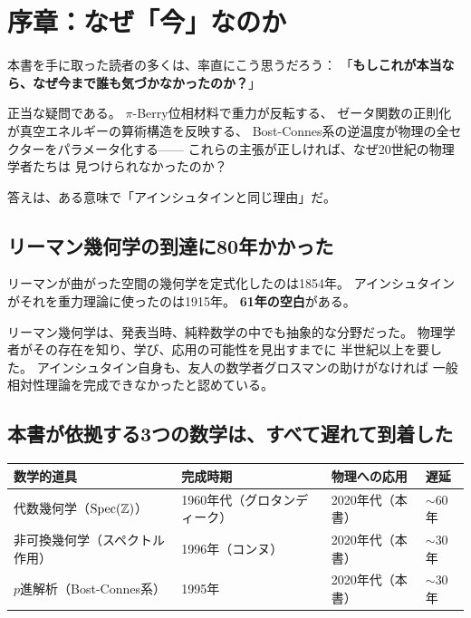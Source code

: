 
\section*{序章：なぜ「今」なのか}

\vspace{1em}

本書を手に取った読者の多くは、率直にこう思うだろう：
「\textbf{もしこれが本当なら、なぜ今まで誰も気づかなかったのか？}」

正当な疑問である。
$\pi$-Berry位相材料で重力が反転する、
ゼータ関数の正則化が真空エネルギーの算術構造を反映する、
Bost-Connes系の逆温度が物理の全セクターをパラメータ化する——
これらの主張が正しければ、なぜ20世紀の物理学者たちは
見つけられなかったのか？

答えは、ある意味で「アインシュタインと同じ理由」だ。

\subsection*{リーマン幾何学の到達に80年かかった}

リーマンが曲がった空間の幾何学を定式化したのは1854年。
アインシュタインがそれを重力理論に使ったのは1915年。
\textbf{61年の空白}がある。

リーマン幾何学は、発表当時、純粋数学の中でも抽象的な分野だった。
物理学者がその存在を知り、学び、応用の可能性を見出すまでに
半世紀以上を要した。
アインシュタイン自身も、友人の数学者グロスマンの助けがなければ
一般相対性理論を完成できなかったと認めている。

\subsection*{本書が依拠する3つの数学は、すべて遅れて到着した}

\begin{center}
\begin{tabular}{llll}
\toprule
数学的道具 & 完成時期 & 物理への応用 & 遅延 \\
\midrule
代数幾何学（$\operatorname{Spec}(\mathbb{Z})$） & 1960年代（グロタンディーク） & 2020年代（本書） & $\sim 60$年 \\
非可換幾何学（スペクトル作用） & 1996年（コンヌ） & 2020年代（本書） & $\sim 30$年 \\
$p$進解析（Bost-Connes系） & 1995年 & 2020年代（本書） & $\sim 30$年 \\
\bottomrule
\end{tabular}
\end{center}

